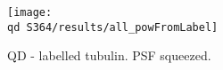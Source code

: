 \begin{figure}[!htb]
	\newcommand{\wf}{.9\textwidth}
	\centering
	\texttt{[image: \\qd S364/results/all\_powFromLabel]}
	\caption{QD - labelled tubulin. PSF squeezed.}
\end{figure}


%

